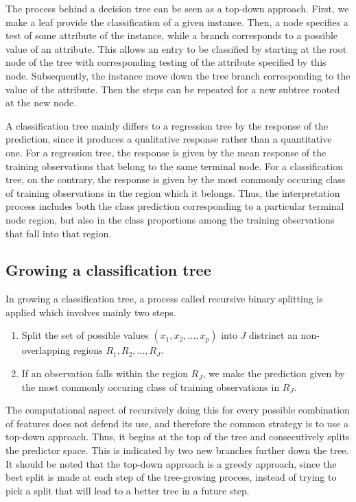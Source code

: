 The process behind a decision tree can be seen as a top-down approach. First, we make a leaf provide the classification of a given instance. Then, a node specifies a test of some attribute of the instance, while a branch corresponds to a possible value of an attribute. This allows an entry to be classified by starting at the root node of the tree with corresponding testing of the attribute specified by this node. Subsequently, the instance move down the tree branch corresponding to the value of the attribute. Then the steps can be repeated for a new subtree rooted at the new node.

A classification tree mainly differs to a regression tree by the response of the prediction, since it produces a qualitative response rather than a quantitative one. For a regression tree, the response is given by the mean response of the training observations that belong to the same terminal node. For a classification tree, on the contrary, the response is given by the most commonly occuring class of training observations in the region which it belongs. Thus, the interpretation process includes both the class prediction corresponding to a particular terminal node region, but also in the class proportions among the training observations that fall into that region.

\subsection{Growing a classification tree}

In growing a classification tree, a process called recursive binary splitting is applied which involves mainly two steps.

\begin{enumerate}
  \item Split the set of possible values $(x_1, x_2,...,x_p)$ into $J$ distrinct an non-overlapping regions $R_1, R_2, ..., R_{J}$.
  \item If an observation falls within the region $R_J$, we make the prediction given by the most commonly occuring class of training observations in $R_{J}$.
\end{enumerate}

The computational aspect of recursively doing this for every possible combination of features does not defend its use, and therefore the common strategy is to use a top-down approach. Thus, it begins at the top of the tree and consecutively splits the predictor space. This is indicated by two new branches further down the tree. It should be noted that the top-down approach is a greedy approach, since the best split is made at each step of the tree-growing process, instead of trying to pick a split that will lead to a better tree in a future step.

